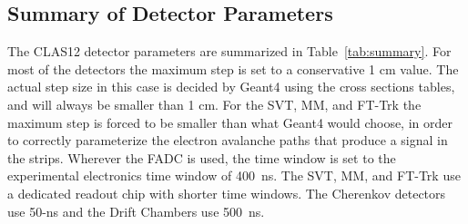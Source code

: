 \subsection{Summary of Detector Parameters}

The CLAS12 detector parameters are summarized in Table~\ref{tab:summary}. For most of the detectors the
maximum step is set to a conservative 1 cm value. The actual step size in this case is decided by Geant4 using the
cross sections tables, and will always be smaller than 1 cm. For the SVT, MM, and FT-Trk the maximum step is
forced to be smaller than what Geant4 would choose, in order to correctly parameterize the electron avalanche
paths that produce a signal in the strips. Wherever the FADC is used, the time window is set to the experimental
electronics time window of 400~ns. The SVT, MM, and FT-Trk use a dedicated readout chip with shorter time
windows. The Cherenkov detectors use 50-ns and the Drift Chambers use 500~ns.

